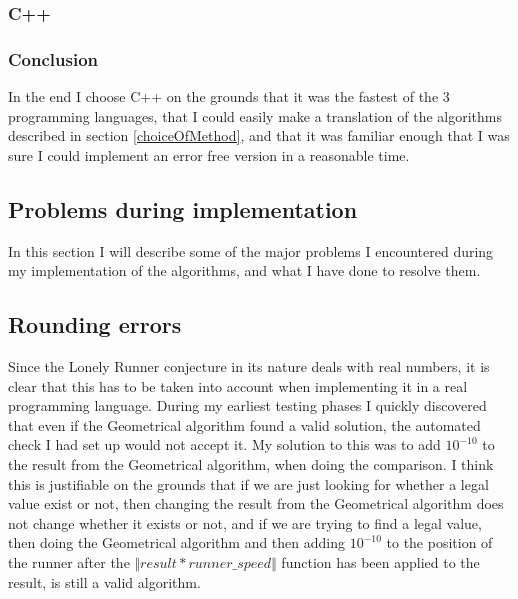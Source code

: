 \subsubsection{C++}  

\subsubsection{Conclusion}
In the end I choose C++ on the grounds that it was the fastest of the 3 programming languages, that I could easily make a translation of the algorithms described in section \ref{choiceOfMethod}, and that it was familiar enough that I was sure I could implement an error free version in a reasonable time.

\subsection{Problems during implementation}
In this section I will describe some of the major problems I encountered during my implementation of the algorithms, and what I have done to resolve them.

\subsection{Rounding errors}
Since the Lonely Runner conjecture in its nature deals with real numbers, it is clear that this has to be taken into account when implementing it in a real programming language. During my earliest testing phases I quickly discovered that even if the Geometrical algorithm found a valid solution, the automated check I had set up would not accept it. My solution to this was to add $10^{-10}$ to the result from the Geometrical algorithm, when doing the comparison. I think this is justifiable on the grounds that if we are just looking for whether a legal value exist or not, then changing the result from the Geometrical algorithm does not change whether it exists or not, and if we are trying to find a legal value, then doing the Geometrical algorithm and then adding $10^{-10}$ to the position of the runner after the $\Vert result * runner\_speed \Vert$ function has been applied to the result, is still a valid algorithm.

